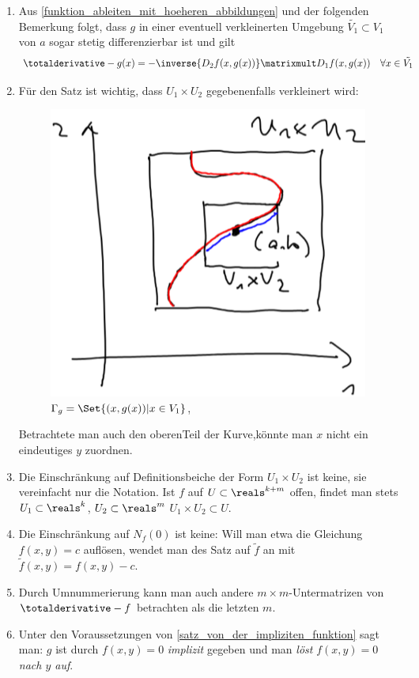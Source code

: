 \begin{bemerkungen*}
  \begin{enumerate}
    \item \label{implizite_funktion_auf_umgebung_stetig_differenzierbar} Aus \ref{funktion_ableiten_mit_hoeheren_abbildungen} und der folgenden Bemerkung folgt, dass \( g \) in einer eventuell verkleinerten Umgebung \( \tilde{V_1}\subset V_1 \) von \( a \) sogar stetig differenzierbar ist und gilt
    \begin{equation*}
      \totalderivative-{g}(x)=-\inverse{D_2 f(x,g(x))}\matrixmult D_1f(x,g(x))\quad \forall x\in \tilde{V_1}
    \end{equation*}
    \item Für den Satz ist wichtig, dass \( U_1\times U_2 \) gegebenenfalls verkleinert wird:
    \begin{figure}[H]
      \centering
      \includegraphics[width=0.5\linewidth]{figures/verkleinerter_definitionsbereich_implizite_funktion}
      \caption*{\textcolor{Blue}{\( \Gamma_g=\Set{(x,g(x))|x\in V_1} \)},\textcolor{Red}{}}
      \label{fig:verkleinerter_definitionsbereich_implizite_funktion}
    \end{figure}
    Betrachtete man auch den oberenTeil der Kurve,könnte man \( x \) nicht ein eindeutiges \( y \) zuordnen.
    \item Die Einschränkung auf Definitionsbeiche der Form \( U_1\times U_2  \) ist keine, sie vereinfacht nur die Notation. Ist \( f \) auf \( U\subset \reals^{k+m} \) offen, findet man stets \( U_1\subset \reals^k \), \( U_2\subset \reals^m \) \sd \( U_1\times U_2\subset U \).
    \item Die Einschränkung auf \( N_f(0) \) ist keine: Will man etwa die Gleichung \( f(x,y)=c \) auflösen, wendet man des Satz auf \( \tilde{f} \) an mit \( \tilde{f}(x,y)=f(x,y)-c \).
    \item Durch Umnummerierung kann man auch andere \( m\times m \)-Untermatrizen von \( \totalderivative-{f} \) betrachten als die letzten \( m \).
    \item Unter den Voraussetzungen von \ref{satz_von_der_impliziten_funktion} sagt man: \( g \) ist durch \( f(x,y)=0 \) \emph{implizit} gegeben und man \emph{löst} \( f(x,y)=0 \) \emph{nach \( y \) auf}.
  \end{enumerate}
\end{bemerkungen*}
